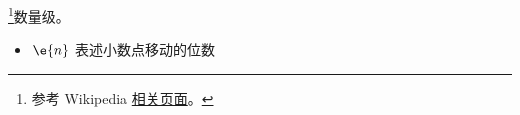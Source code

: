 
\begin{issues}
\issueDraft
\end{issues}

\footnote{参考 Wikipedia \href{https://en.wikipedia.org/wiki/Order_of_magnitude}{相关页面}。}数量级。

\begin{itemize}
\item $\e{n}$ 表述小数点移动的位数
\end{itemize}

